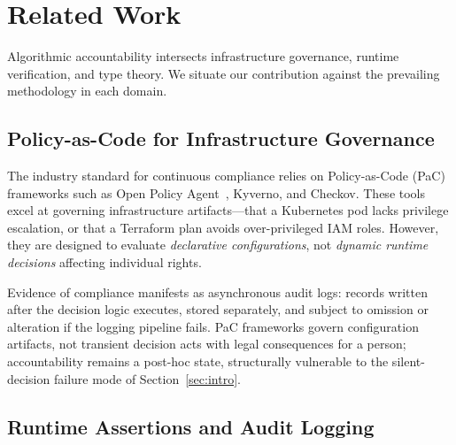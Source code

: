 
\section{Related Work}
\label{sec:related_work}

Algorithmic accountability intersects infrastructure governance, runtime
verification, and type theory.  We situate our contribution against the
prevailing methodology in each domain.

\subsection{Policy-as-Code for Infrastructure Governance}
\label{sec:pac}

The industry standard for continuous compliance relies on
Policy-as-Code (PaC) frameworks such as Open Policy
Agent~\cite{opa2024}, Kyverno, and Checkov.
These tools excel at governing infrastructure artifacts---that a
Kubernetes pod lacks privilege escalation, or that a Terraform plan
avoids over-privileged IAM roles.
However, they are designed to evaluate \emph{declarative
configurations}, not \emph{dynamic runtime decisions} affecting
individual rights.

Evidence of compliance manifests as asynchronous audit logs: records
written after the decision logic executes, stored separately, and
subject to omission or alteration if the logging pipeline fails.
PaC frameworks govern configuration artifacts, not transient decision
acts with legal consequences for a person; accountability remains a
post-hoc state, structurally vulnerable to the silent-decision
failure mode of Section~\ref{sec:intro}.

\subsection{Runtime Assertions and Audit Logging}
\label{sec:runtime}

